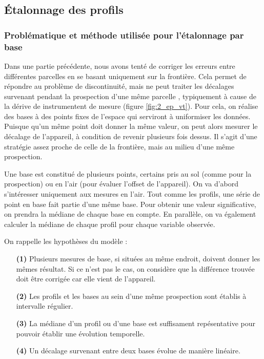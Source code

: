 \documentclass[12pt]{article}
\begin{document}
\newpage  
\subsection{Étalonnage des profils}\label{2-etal}
\subsubsection{Problématique et méthode utilisée pour l'étalonnage par base}

    \label{2_evol_base} Dans une partie précédente, nous avons tenté de corriger les erreurs entre différentes parcelles en se basant uniquement sur la frontière. Cela permet de répondre au problème de discontinuité, mais ne peut traiter les décalages survenant pendant la prospection d'une même parcelle , typiquement à cause de la dérive de instrumentent de mesure (figure \ref{fig:2_ep_vt}). Pour cela, on réalise des bases à des points fixes de l'espace qui serviront à uniformiser les données. Puisque qu'un même point doit donner la même valeur, on peut alors mesurer le décalage de l'appareil, à condition de revenir plusieurs fois dessus. Il s'agit d'une stratégie assez proche de celle de la frontière, mais au milieu d'une même prospection.

    Une base est constitué de plusieurs points, certains pris au sol (comme pour la prospection) ou en l'air (pour évaluer l'offset de l'appareil). On va d'abord s'intéresser uniquement aux mesures en l'air. Tout comme les profils, une série de point en base fait partie d'une même base. Pour obtenir une valeur significative, on prendra la médiane de chaque base en compte. En parallèle, on va également calculer la médiane de chaque profil pour chaque variable observée.

    On rappelle les hypothèses du modèle :
    \begin{enumerate}
        \item[\textbf{(1)}] Plusieurs mesures de base, si situées au même endroit, doivent donner les mêmes résultat. Si ce n'est pas le cas, on considère que la différence trouvée doit être corrigée car elle vient de l'appareil.
        \item[\textbf{(2)}] Les profils et les bases au sein d'une même prospection sont établis à intervalle régulier.
        \item[\textbf{(3)}] La médiane d'un profil ou d'une base est suffisament repésentative pour pouvoir établir une évolution temporelle.
        \item[\textbf{(4)}] Un décalage survenant entre deux bases évolue de manière linéaire.
    \end{enumerate}
\end{document}
